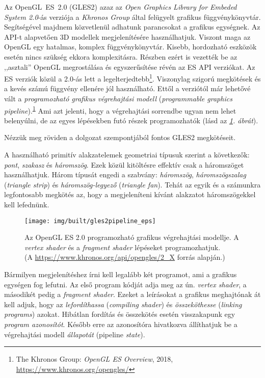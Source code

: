 \documentclass[12pt]{report}
\theoremstyle{definition}
\newcommand{\inenglish}[1]{\textsl{#1}}
\begin{document}
Az OpenGL~ES~2.0 (GLES2) azaz az \emph{Open Graphics Library for Embeded System
2.0}-ás verziója a \emph{Khronos Group} által felügyelt grafikus
függvénykönyvtár.  Segítségével majdnem közvetlenül adhatunk parancsokat a
grafikus egységnek. Az API-t alapvetően 3D modellek megjelenítésére
használhatjuk. Viszont maga az OpenGL egy hatalmas, komplex függvénykönyvtár.
Kisebb, hordozható eszközök esetén nincs szükség ekkora komplexitásra. Részben
ezért is vezették be az ,,asztali'' OpenGL megrostálása és egyszerűsítése révén
az ES API verziókat. Az ES verziók közül a 2.0-ás lett a
legelterjedtebb\footnote{The Khronos Group: \emph{OpenGL ES Overview}, 2018,
\footnotesize{\url{https://www.khronos.org/opengles/}}\label{fn:GLES2}}.
Viszonylag szigorú megkötések és a kevés számú függvény ellenére jól
használható. Ettől a verziótól már lehetővé vált a \emph{programozható grafikus
végrehajtási modell} (\inenglish{programmable graphics
pipeline}).\textsuperscript{\ref{fn:GLES2}} Ami azt jelenti, hogy a végrehajtási
sorrendbe ugyan nem lehet belenyúlni, de az egyes lépésekben futó részek
programozhatók (lásd az \emph{\ref{opengles_20_pipeline2}. ábrát}).

Nézzük meg röviden a dolgozat szempontjából fontos GLES2 megkötéseit.

A használható primitív alakzatelemek geometriai típusuk szerint a következők:
\emph{pont}, \emph{szakasz} és \emph{háromszög}. Ezek közül kitöltésre effektív
csak a háromszöget használhatjuk. Három típusát engedi a szabvány:
\emph{háromszög}, \emph{háromszögszalag} (\inenglish{triangle strip}) és
\emph{háromszög-legyező} (\inenglish{triangle fan}). Tehát az egyik és a
számunkra legfontosabb megkötés az, hogy a megjeleníteni kívánt alakzatot
háromszögekkel kell lefednünk.

  \begin{figure}
    \texttt{[image: img/built/gles2pipeline\_eps]}
    \caption{\label{opengles_20_pipeline2} Az OpenGL ES 2.0 programozható
    grafikus végrehajtási modellje. A \emph{vertex shader} és a \emph{fragment
    shader} lépéseket programozhatjuk. \\%
    (A {\footnotesize\url{https://www.khronos.org/api/opengles/2_X}} forrás
    alapján.)
    }
  \end{figure}

Bármilyen megjelenítéshez írni kell legalább két programot, ami a grafikus
egységen fog lefutni. Az első program kódját adja meg az ún. \emph{vertex
shader}, a másodikét pedig a \emph{fragment shader}. Ezeket a leírásokat a
grafikus meghajtónak át kell adjuk, hogy az \emph{lefordíthassa}
(\inenglish{compiling shader}) és \emph{összeköthesse} (\inenglish{linking
programs}) azokat. Hibátlan fordítás és összekötés esetén visszakapunk egy
\emph{program azonosítót}.  Később erre az azonosítóra hivatkozva állíthatjuk be
a végrehajtási modell \emph{állapotát} (pipeline \inenglish{state}).
\end{document}
